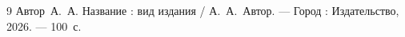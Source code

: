 \clearpage
{}
{}
\begin{thebibliography}{9}
    Автор~А.~А. Название : вид издания / А.~А.~Автор. --- Город : Издательство,
    2026. --- 100~с.
\end{thebibliography}
